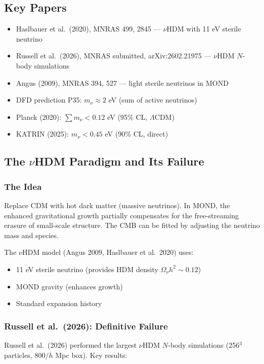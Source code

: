 \documentclass[11pt,a4paper]{article}
\begin{document}
\subsection{Key Papers}

\begin{itemize}
\item Haslbauer et al.\ (2020), MNRAS 499, 2845 --- $\nu$HDM with 11 eV sterile neutrino
\item Russell et al.\ (2026), MNRAS submitted, arXiv:2602.21975 --- $\nu$HDM $N$-body simulations
\item Angus (2009), MNRAS 394, 527 --- light sterile neutrinos in MOND
\item DFD prediction P35: $m_\nu \approx 2$ eV (sum of active neutrinos)
\item Planck (2020): $\sum m_\nu < 0.12$ eV (95\% CL, $\Lambda$CDM)
\item KATRIN (2025): $m_\nu < 0.45$ eV (90\% CL, direct)
\end{itemize}

\subsection{The $\nu$HDM Paradigm and Its Failure}

\subsubsection{The Idea}

Replace CDM with hot dark matter (massive neutrinos). In MOND, the enhanced gravitational growth partially compensates for the free-streaming erasure of small-scale structure. The CMB can be fitted by adjusting the neutrino mass and species.

The $\nu$HDM model (Angus 2009, Haslbauer et al.\ 2020) uses:
\begin{itemize}
\item 11 eV sterile neutrino (provides HDM density $\Omega_\nu h^2 \sim 0.12$)
\item MOND gravity (enhances growth)
\item Standard expansion history
\end{itemize}

\subsubsection{Russell et al.\ (2026): Definitive Failure}

Russell et al.\ (2026) performed the largest $\nu$HDM $N$-body simulations (256$^3$ particles, $800/h$ Mpc box). Key results:
\end{document}
